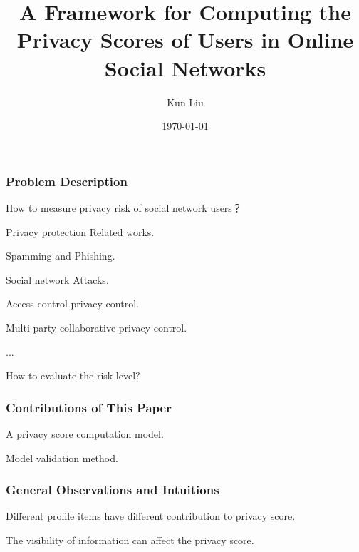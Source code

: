 \documentclass{beamer}
\title[Online Social Network Privacy]{A Framework for Computing the
  Privacy Scores of Users in Online Social Networks}
\author{Kun Liu}
\date{\today}
\begin{document}
\begin{frame}
  \titlepage
\end{frame}

\begin{frame}
  \frametitle{Problem Description}
  \begin{block}
    {How to measure privacy risk of social network users？}
    \begin{itemize}
      \LARGE{
    \item Privacy protection Related works. 
      \begin{itemize}
        \Large{
      \item Spamming and Phishing.
      \item Social network Attacks. 
      \item Access control privacy control.
      \item Multi-party collaborative privacy control. 
      \item ...}
      \end{itemize}
    \item How to evaluate the risk level? }
    \end{itemize}
  \end{block}
\end{frame}

\begin{frame}
  \frametitle{Contributions of This Paper}
    \begin{itemize} 
      \LARGE{
      \item A privacy score computation model. 
      \item Model validation method. }
    \end{itemize}
\end{frame}

\begin{frame}%
  \frametitle{General Observations and Intuitions}
  \begin{itemize}
    \LARGE{
    \item Different profile items have different contribution to
      privacy score. 
    \item The visibility of information can affect the privacy score.}
  \end{itemize}
\end{frame}
\end{document}
